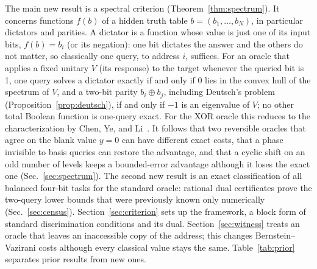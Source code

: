 \documentclass[
  aps,
  pra,
  reprint,
  nofootinbib
]{revtex4-2}
\begin{document}
The main new result is a spectral criterion (Theorem~\ref{thm:spectrum}). It
concerns functions \(f(b)\) of a hidden
truth table \(b=(b_1,\ldots,b_N)\), in particular dictators and parities. A
dictator is a function whose value is just one of its input bits,
\(f(b)=b_i\) (or its negation): one bit dictates the answer and the others do
not matter, so classically one query, to address \(i\), suffices. For an
oracle that applies a fixed unitary \(V\) (its response) to the target
whenever the queried bit is 1, one query solves a dictator exactly if
and only if \(0\) lies in the convex hull of the spectrum of \(V\), and a
two-bit parity \(b_i\oplus b_j\), including Deutsch's problem
(Proposition~\ref{prop:deutsch}), if and only if \(-1\) is an
eigenvalue of \(V\); no other total Boolean function is one-query exact. For
the XOR oracle this reduces to the characterization by Chen, Ye, and
Li~\cite{ChenYeLi2020}. It follows that two reversible oracles that agree on
the blank value \(y=0\) can have different exact costs, that a phase invisible
to basis queries can restore the advantage, and that a cyclic shift on an odd
number of levels keeps a bounded-error advantage although it loses the exact
one
(Sec.~\ref{sec:spectrum}). The second new result is an exact classification of
all balanced four-bit tasks for the standard oracle: rational dual
certificates prove the two-query lower bounds that were previously known only
numerically~\cite{MontanaroJozsaMitchison2015} (Sec.~\ref{sec:census}).
Section~\ref{sec:criterion} sets up the framework, a block form of standard
discrimination conditions and its dual. Section~\ref{sec:witness} treats an
oracle that leaves an inaccessible copy of the address; this changes
Bernstein--Vazirani costs although every classical value stays the same.
Table~\ref{tab:prior} separates prior results from new ones.
\end{document}
